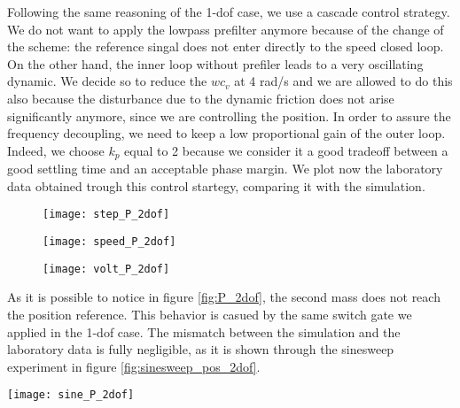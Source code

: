 Following the same reasoning of the 1-dof case, we use a cascade control strategy. We do not want to apply the lowpass prefilter anymore because of the change of the scheme: the reference singal does not enter directly to the speed closed loop. On the other hand, the inner loop without prefiler leads to a very oscillating dynamic. We decide so to reduce the $wc_v$ at 4 rad/s and we are allowed to do this also because the disturbance due to the dynamic friction does not arise significantly anymore, since we are controlling the position.
In order to assure the frequency decoupling, we need to keep a low proportional gain of the outer loop. Indeed, we choose $k_p$ equal to 2 because we consider it a good tradeoff between a good settling time and an acceptable phase margin.
\newline
We plot now the laboratory data obtained trough this control startegy, comparing it with the simulation.
\begin{figure*}[h]
	\centering
	\begin{subfigure}{0.48\columnwidth}
		\texttt{[image: step\_P\_2dof]}
	\end{subfigure}
	\begin{subfigure}{0.45\columnwidth}
		\texttt{[image: speed\_P\_2dof]}
	\end{subfigure}
	\begin{subfigure}{0.45\columnwidth}
		\texttt{[image: volt\_P\_2dof]}
	\end{subfigure}
	\caption{Position control loop with $k_{p} =2$ with a position step of $\frac{\pi}{4}$}
	\label{fig:P_2dof}
\end{figure*}

As it is possible to notice in figure \ref{fig:P_2dof}, the second mass does not reach the position reference. This behavior is casued by the same switch gate we applied in the 1-dof case.
The mismatch between the simulation and the laboratory data is fully negligible, as it is shown through the sinesweep experiment in figure \ref{fig:sinesweep_pos_2dof}.
\begin{figure*}[h]
	\centering
	\texttt{[image: sine\_P\_2dof]}
	\caption{Sineweep experiment from 0.1 Hz to 1 Hz in 100s}
	\label{fig:sinesweep_pos_2dof}
\end{figure*}